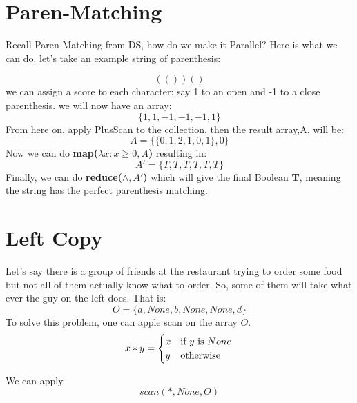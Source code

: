 \documentclass[12pt]{article}
\begin{document}
	\MakeScribeTop
\section{Paren-Matching}
Recall Paren-Matching from DS, how do we make it Parallel? Here is what we can do. let's take an example string of parenthesis:

$$(())()$$
we can assign a score to each character: say 1 to an open and -1 to a close parenthesis. we will now have an array:
$$\{1,1,-1,-1,-1,1\}$$
From here on, apply PlusScan to the collection, then the result array,A, will be:
$$A = \{\{0,1,2,1,0,1\},0\}$$   
Now we can do \textbf{map($\lambda x: x \geq 0,A$)} resulting in:
$$A' = \{T,T,T,T,T,T\}$$
Finally, we can do \textbf{reduce($\wedge, A'$)} which will give the final Boolean \textbf{T}, meaning the string has the perfect parenthesis matching.
\section{Left Copy}
Let's say there is a group of friends at the restaurant trying to order some food but not all of them actually know what to order. So, some of them will take what ever the guy on the left does. That is:
 $$O = \{a,None, b, None, None, d\}$$
To solve this problem, one can apple scan on the array $O$.  \\
$$
x*y = \begin{cases}
x &\text{if $y$ is $None$} \\
y &\text{otherwise}
\end{cases}\\
$$

We can apply $$scan(*,None,O)$$
\end{document}
